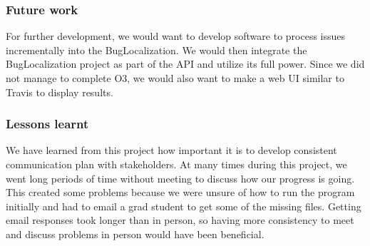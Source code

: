 \documentclass[12pt]{article}
\begin{document}
\hypertarget{future-work}{%
\subsubsection{Future work}\label{future-work}}

For further development, we would want to develop software to process
issues incrementally into the BugLocalization. We would then integrate
the BugLocalization project as part of the API and utilize its full
power. Since we did not manage to complete O3, we would also want to
make a web UI similar to Travis to display results.

\hypertarget{lessons-learnt}{%
\subsubsection{Lessons learnt}\label{lessons-learnt}}

We have learned from this project how important it is to develop
consistent communication plan with stakeholders. At many times during
this project, we went long periods of time without meeting to discuss
how our progress is going. This created some problems because we were
unsure of how to run the program initially and had to email a grad
student to get some of the missing files. Getting email responses took
longer than in person, so having more consistency to meet and discuss
problems in person would have been beneficial.



\end{document}
